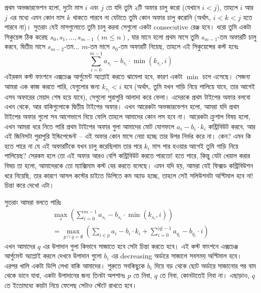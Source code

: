 \begin{Hint}{5.3}
প্রথম অভজারভেশন হলো, দুটো মাস $i$ এবং $j$ তে যদি তুমি ২টি অফার চালু করো (যেখানে $i < j$), তাহলে $i$ আর $j$ এর মধ্যে এমন কোন মাস $k$ থাকতে পারবে না যেটাতে তুমি কোন অফার চালু করোনি (অর্থাৎ, $i < k < j$ হতে পারবে না)। সুতরাং যেই মাসগুলোতে তুমি চালু করবা সেগুলো একটা consecutive রেঞ্জ হবে। ধরো তুমি একটা সিকুয়েন্স ঠিক করেছ $s_0, s_1, \ldots, s_{m-1} \, (m \le n)$, যার মানে হলো প্রথম মাসে তুমি $s_{m-1}$-তম অফারটি চালু করবে, দ্বিতীয় মাসে $s_{m-2}$-তম... $m$-তম মাসে $s_0$-তম অফারটি নিয়েছ, তাহলে এই সিকুয়েন্সের কস্ট হবেঃ
\[
  \sum_{i=0}^{m-1} a_{s_i} - b_{s_i} \cdot \min(k_{s_i}, i)
\]
এইরকম কস্ট ফাংশনে এক্সচেঞ্জ আর্গুমেন্ট অ্যাপ্লাই করতে ঝামেলা হবে, কারণ একটা $\min$ চলে এসেছে। সেজন্য আমরা এক কাজ করতে পারি, যেগুলোর জন্য $k_{s_i} < i$ হবে (অর্থাৎ, তুমি যখন গাড়ি নিয়ে পালিয়ে যাবে, তার আগেই এসব অফারের মেয়াদ শেষ হয়ে যাবে), সেগুলো পুরাপুরি আলাদা করে ফেলা। এদেরকে প্রথম টাইপের অফার বলবো এখন থেকে, আর বাকিগুলোকে দ্বিতীয় টাইপের অফার। এখন আরেকটা অভজারভেশন হলো, আমরা যদি প্রথম টাইপের অফার গুলো সব আগেভাগে নিয়ে ফেলি তাহলে আমাদের কোন লস হবে না। আরেকটা ক্রুশাল বিষয় হলো, এখন আমরা ধরে নিতে পারি প্রথম টাইপের অফার গুলা আমাদের মোট যোগফলে $a_i - b_i \cdot k_i$ কন্ট্রিবিউট করবে, আর এই জিনিসটা পুরাপুরি ইন্ডিপেন্ডেন্ট -- এই অফার কোন মাসে নেয়া হচ্ছে তার উপর নির্ভর করে না। কেন? এমন কি হতে পারে না যে এই অফারটিকে যখন চালু করেছিলাম তার পরে $k_i$ মাস পার হওয়ার আগেই তুমি গাড়ি নিয়ে পালিয়েছ? সেরকম হলে তো এই অফার আরও বেশি কন্ট্রিবিউট করতে পারতো! হতে পারে, কিন্তু যেটা খেয়াল করার বিষয় তা হলো, আমাদেরকে তো ম্যাক্সিমাম কস্ট বের করতে বলেছে। এমন যদি হয়, আমরা যেই ফিক্সড কন্ট্রিবিউশন ধরে নিয়েছি, তার কারণে আসল কস্টের চাইতে ডিপিতে কম অ্যাড হচ্ছে, তাহলে সেই সলিউশনটা অপ্টিমাল হবে না! চিন্তা করে দেখো এটা।

\noindent সুতরাং আমরা বলতে পারিঃ
\begin{gather*}
  \max_{s} \left ( \sum_{i=0}^{m-1} a_{s_i} - b_{s_i} \cdot \min(k_{s_i}, i) \right )\\
  = \max_{p \cap q = \emptyset} \left ( \sum_{i \in p} a_i - b_i \cdot k_i + \sum_{i=0}^{|q|-1} a_{q_i} - b_{q_i} \cdot i \right )
\end{gather*}
এখন আমাদের $q$ এর উপাদান গুলা কিভাবে সাজাতে হবে সেটা চিন্তা করতে হবে। এই কস্ট ফাংশনে এক্সচেঞ্জ আর্গুমেন্ট অ্যাপ্লাই করলে দেখবে উপাদান গুলো $b_i$ এর decreasing অর্ডারে সাজালে সবসময় অপ্টিমাল হবে। এরপর খালি একটা ডিপি লেখা বাকি আমাদের। শুরুতে সবকিছুকে $b_i$ দিয়ে বড় থেকে ছোট অর্ডারে সাজানোর পর বাম থেকে ডানে যাবা, একটা উপাদানের জন্য তিনটা অপশানঃ $p$ তে নিবা, $q$ তে নিবা, কোনটাতেই নিবা না। এছাড়াও, $q$ তে ইতোমধ্যে কয়টা নিয়ে ফেলেছ সেটাও স্টেটে রাখতে হবে।
\end{Hint}
